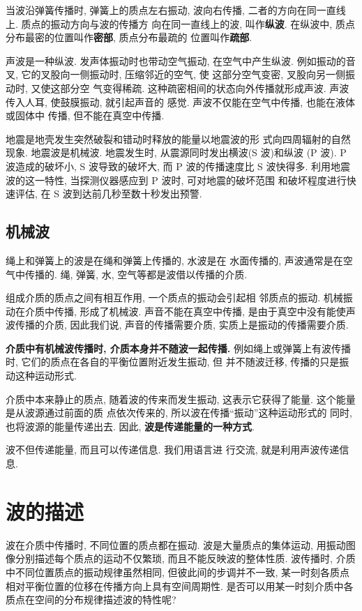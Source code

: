 \documentclass[11pt,a4paper]{ctexbook}
\begin{document}
当波沿弹簧传播时, 弹簧上的质点左右振动, 波向右传播,
二者的方向在同一直线上. 质点的振动方向与波的传播方
向在同一直线上的波, 叫作\textbf{纵波}.
在纵波中, 质点分布最密的位置叫作\textbf{密部}, 质点分布最疏的
位置叫作\textbf{疏部}.

声波是一种纵波. 发声体振动时也带动空气振动, 在空气中产生纵波.
例如振动的音叉, 它的叉股向一侧振动时, 压缩邻近的空气, 使
这部分空气变密, 叉股向另一侧振动时, 又使这部分空
气变得稀疏. 这种疏密相间的状态向外传播就形成声波.
声波传入人耳, 使鼓膜振动, 就引起声音的
感觉. 声波不仅能在空气中传播, 也能在液体或固体中
传播, 但不能在真空中传播.

{\kaishu 地震是地壳发生突然破裂和错动时释放的能量以地震波的形
式向四周辐射的自然现象. 地震波是机械波. 地震发生时, 从震源同时发出横波(S
波)和纵波 (P 波). P 波造成的破坏小, S 波导致的破坏大, 而 P 波的传播速度比 S
波快得多. 利用地震波的这一特性, 当探测仪器感应到 P 波时, 可对地震的破坏范围
和破坏程度进行快速评估, 在 S 波到达前几秒至数十秒发出预警. }

\subsection{机械波}
绳上和弹簧上的波是在绳和弹簧上传播的, 水波是在
水面传播的, 声波通常是在空气中传播的. 绳, 弹簧, 水,
空气等都是波借以传播的介质.

组成介质的质点之间有相互作用, 一个质点的振动会引起相
邻质点的振动. 机械振动在介质中传播, 形成了机械波.
声音不能在真空中传播, 是由于真空中没有能使声波传播的介质,
因此我们说, 声音的传播需要介质, 实质上是振动的传播需要介质.

\textbf{介质中有机械波传播时, 介质本身并不随波一起传播.}
例如绳上或弹簧上有波传播时, 它们的质点在各自的平衡位置附近发生振动, 但
并不随波迁移, 传播的只是振动这种运动形式.

介质中本来静止的质点, 随着波的传来而发生振动,
这表示它获得了能量. 这个能量是从波源通过前面的质
点依次传来的, 所以波在传播``振动''这种运动形式的
同时, 也将波源的能量传递出去. 因此,
\textbf{波是传递能量的一种方式}.

波不但传递能量, 而且可以传递信息. 我们用语言进
行交流, 就是利用声波传递信息.

\section{波的描述}

波在介质中传播时, 不同位置的质点都在振动.
波是大量质点的集体运动, 用振动图像分别描述每个质点的运动不仅繁琐,
而且不能反映波的整体性质. 波传播时, 介质中不同位置质点的振动规律虽然相同,
但彼此间的步调并不一致, 某一时刻各质点相对平衡位置的位移在传播方向上具有空间周期性.
是否可以用某一时刻介质中各质点在空间的分布规律描述波的特性呢?
\end{document}
